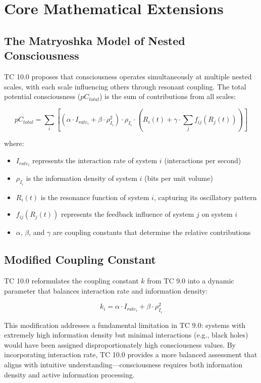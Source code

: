 \documentclass[12pt]{article}
\begin{document}
\section{Core Mathematical Extensions}

\subsection{The Matryoshka Model of Nested Consciousness}

TC 10.0 proposes that consciousness operates simultaneously at multiple nested scales, with each scale influencing others through resonant coupling. The total potential consciousness ($pC_{total}$) is the sum of contributions from all scales:

\begin{equation}
pC_{total} = \sum_{i} [(\alpha \cdot I_{rate_i} + \beta \cdot \rho_{I_i}^2) \cdot \rho_{I_i} \cdot (R_i(t) + \gamma \cdot \sum_{j} f_{ij}(R_j(t)))]
\end{equation}

where:
\begin{itemize}
    \item $I_{rate_i}$ represents the interaction rate of system $i$ (interactions per second)
    \item $\rho_{I_i}$ is the information density of system $i$ (bits per unit volume)
    \item $R_i(t)$ is the resonance function of system $i$, capturing its oscillatory pattern
    \item $f_{ij}(R_j(t))$ represents the feedback influence of system $j$ on system $i$
    \item $\alpha$, $\beta$, and $\gamma$ are coupling constants that determine the relative contributions
\end{itemize}

\subsection{Modified Coupling Constant}

TC 10.0 reformulates the coupling constant $k$ from TC 9.0 into a dynamic parameter that balances interaction rate and information density:

\begin{equation}
k_i = \alpha \cdot I_{rate_i} + \beta \cdot \rho_{I_i}^2
\end{equation}

This modification addresses a fundamental limitation in TC 9.0: systems with extremely high information density but minimal interactions (e.g., black holes) would have been assigned disproportionately high consciousness values. By incorporating interaction rate, TC 10.0 provides a more balanced assessment that aligns with intuitive understanding—consciousness requires both information density and active information processing.
\end{document}
